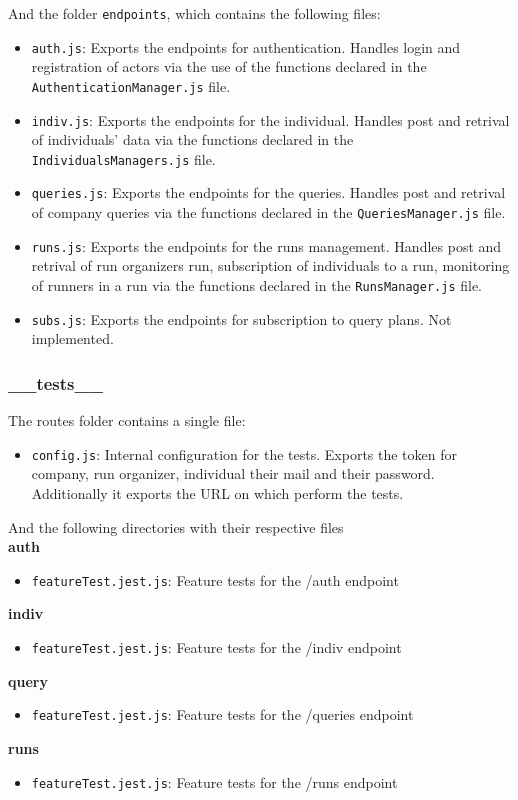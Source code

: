 \noindent And the folder \texttt{endpoints}, which contains the following files: 
\begin{itemize}
    \item \texttt{auth.js}: Exports the endpoints for authentication. Handles login and registration of actors via the use of the functions declared in the \texttt{AuthenticationManager.js} file.
    \item \texttt{indiv.js}: Exports the endpoints for the individual. Handles post and retrival of individuals' data via the functions declared in the \texttt{IndividualsManagers.js} file.
    \item \texttt{queries.js}: Exports the endpoints for the queries. Handles post and retrival of company queries via the functions declared in the \texttt{QueriesManager.js} file.
    \item \texttt{runs.js}: Exports the endpoints for the runs management.  Handles post and retrival of run organizers run, subscription of individuals to a run, monitoring of runners in a run via the functions declared in the \texttt{RunsManager.js} file.
    \item \texttt{subs.js}: Exports the endpoints for subscription to query plans. Not implemented.

\end{itemize}

\subsubsection{\_\_tests\_\_}
The routes folder contains a single file: 
\begin{itemize}
    \item \texttt{config.js}: Internal configuration for the tests. Exports the token for company, run organizer, individual their mail and their password. Additionally it exports the URL on which perform the tests.
\end{itemize}

And the following directories with their respective files \\
\noindent \textbf{auth}
\begin{itemize}
    \item \texttt{featureTest.jest.js}: Feature tests for the /auth endpoint
\end{itemize}
\noindent \textbf{indiv}
\begin{itemize}
    \item \texttt{featureTest.jest.js}: Feature tests for the /indiv endpoint
\end{itemize}
\noindent \textbf{query}
\begin{itemize}
    \item \texttt{featureTest.jest.js}: Feature tests for the /queries endpoint
\end{itemize}
\noindent \textbf{runs}
\begin{itemize}
    \item \texttt{featureTest.jest.js}: Feature tests for the /runs endpoint
\end{itemize}


